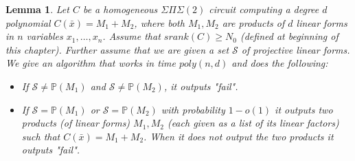 \documentclass[12pt]{caltech_thesis}
\theoremstyle{plain}
\newtheorem{lemma}{Lemma}
\theoremstyle{definition}
\newcommand{\MS}{\mathcal{S}}
\newcommand{\PP}{\mathbb{P}}
\newcommand{\B}[1]{\bar{#1}}
\begin{document}
\begin{lemma}
 Let $C$ be a homogeneous $\Sigma\Pi\Sigma(2)$ circuit computing a degree $d$ polynomial $C(\B{x}) = M_1+M_2$, where
 both $M_1,M_2$ are products of $d$ linear forms in $n$ variables $x_1,\ldots,x_n$. 
Assume that $srank(C)\geq N_0$ (defined at beginning of this chapter). Further assume that we are given a set $\MS$ of projective linear forms.
We give an algorithm that works in time $poly(n,d)$ and does the following:
\begin{itemize}
 \item If $\MS \neq \PP(M_1)$ and $\MS \neq \PP(M_2)$, it outputs \emph{"fail"}.
 \item If $\MS = \PP(M_1)$ or $\MS =\PP(M_2)$ with probability $1-o(1)$ it outputs two products (of linear forms) $M_1,M_2$
 (each given as a list of its linear factors) such that $C(\B{x}) = M_1+M_2$. When it does not output the two products it outputs
 \emph{"fail"}.
\end{itemize}
\end{lemma}
\end{document}
